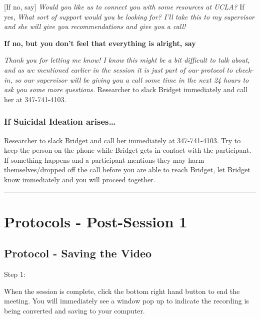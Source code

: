 \documentclass[]{book}
\begin{document}
{[}If no, say{]} \emph{Would you like us to connect you with some resources at UCLA?} If yes, \emph{What sort of support would you be looking for? I'll take this to my supervisor and she will give you recommendations and give you a call!}

\textbf{If no, but you don't feel that everything is alright, say}

\emph{Thank you for letting me know! I know this might be a bit difficult to talk about, and as we mentioned earlier in the session it is just part of our protocol to check-in, so our supervisor will be giving you a call some time in the next 24 hours to ask you some more questions.} Researcher to slack Bridget immediately and call her at 347-741-4103.

\hypertarget{if-suicidal-ideation-arises-1}{%
\subsubsection{If Suicidal Ideation arises\ldots{}}\label{if-suicidal-ideation-arises-1}}

Researcher to slack Bridget and call her immediately at 347-741-4103. Try to keep the person on the phone while Bridget gets in contact with the participant. If something happens and a participant mentions they may harm themselves/dropped off the call before you are able to reach Bridget, let Bridget know immediately and you will proceed together.

\begin{center}\rule{0.5\linewidth}{0.5pt}\end{center}

\hypertarget{protocols---post-session-1-1}{%
\section{Protocols - Post-Session 1}\label{protocols---post-session-1-1}}

\hypertarget{protocol---saving-the-video-1}{%
\subsection{Protocol - Saving the Video}\label{protocol---saving-the-video-1}}

Step 1:

When the session is complete, click the bottom right hand button to end the meeting. You will immediately see a window pop up to indicate the recording is being converted and saving to your computer.
\end{document}

